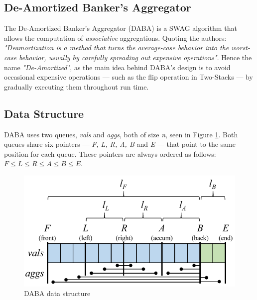 \subsection{De-Amortized Banker’s Aggregator} \label{sec:daba}

The De-Amortized Banker’s Aggregator (DABA) \cite{Tangwongsan-DABA} is a SWAG algorithm that allows the computation of \textit{associative} aggregations. Quoting the authors: \textit{"Deamortization is a method that turns the average-case behavior into the worst-case behavior, usually by carefully spreading out expensive operations"}. Hence the name \textit{"De-Amortized"}, as the main idea behind DABA's design is to avoid occasional expensive operations --- such as the flip operation in Two-Stacks --- by gradually executing them throughout run time.

\subsection*{Data Structure}

DABA uses two queues, \textit{vals} and \textit{aggs}, both of size \textit{n}, seen in Figure \ref{fig:daba-ds}. Both queues share six pointers --- \textit{F, L, R, A, B} and \textit{E} --- that point to the same position for each queue. These pointers are always ordered as follows: $\textit{F} \leq \textit{L} \leq \textit{R} \leq \textit{A} \leq \textit{B} \leq \textit{E}.$

\begin{figure}[!htb]
    \begin{center}
      \includegraphics[scale=0.6]{figures/daba-ds.png}
      \caption{DABA data structure}
      \label{fig:daba-ds}
    \end{center}
\end{figure}

